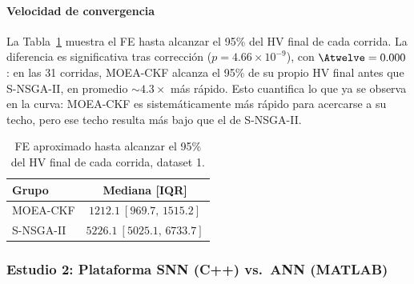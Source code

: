 \paragraph{Velocidad de convergencia} La Tabla~\ref{tab:convergence-speed-ds1} muestra el FE hasta alcanzar el 95\% del HV final de cada corrida. La diferencia es significativa tras corrección ($p=4.66\times10^{-9}$), con $\Atwelve=0.000$: en las 31 corridas, MOEA-CKF alcanza el 95\% de su propio HV final antes que S-NSGA-II, en promedio $\sim4.3\times$ más rápido. Esto cuantifica lo que ya se observa en la curva: MOEA-CKF es sistemáticamente más rápido para acercarse a su techo, pero ese techo resulta más bajo que el de S-NSGA-II.

\begin{table}[htbp]
\centering
\small
\caption{FE aproximado hasta alcanzar el 95\% del HV final de cada corrida, dataset 1.}
\label{tab:convergence-speed-ds1}
\begin{tabular}{@{}lc}
\toprule
\textbf{Grupo} & \textbf{Mediana [IQR]} \\
\midrule
MOEA-CKF & $1212.1\ [969.7,\,1515.2]$ \\
S-NSGA-II & $5226.1\ [5025.1,\,6733.7]$ \\
\bottomrule
\end{tabular}
\end{table}

\subsubsection{Estudio 2: Plataforma SNN (C++) vs.\ ANN (MATLAB)}
\label{sec:ds1-plataforma}

